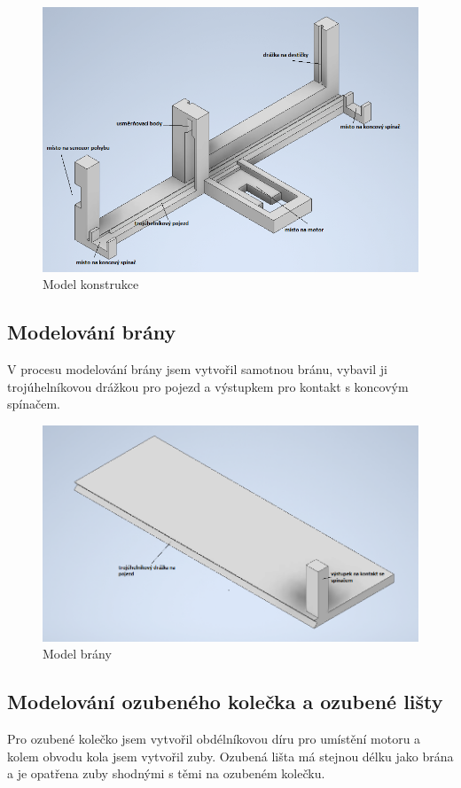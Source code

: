 \documentclass[12pt, a4paper, twoside]{report}
\begin{document}
	\begin{figure}[h]
		\centering
		\includegraphics[width=0.7\linewidth]{image/konstrukce.png}
		\caption{Model konstrukce}
		\label{fig:konstrukceobr}
	\end{figure}
	
	\subsection{Modelování brány}
	
	\noindent V procesu modelování brány jsem vytvořil samotnou bránu, vybavil ji trojúhelníkovou drážkou pro pojezd a výstupkem pro kontakt s koncovým spínačem. \\
	
	\begin{figure}[h]
		\centering
		\includegraphics[width=0.7\linewidth]{image/brana.png}
		\caption{Model brány}
		\label{fig:branaobr}
	\end{figure}
	
	\newpage	
	
	\subsection{Modelování ozubeného kolečka a ozubené lišty}
	
	\noindent Pro ozubené kolečko jsem vytvořil obdélníkovou díru pro umístění motoru a kolem obvodu kola jsem vytvořil zuby. Ozubená lišta má stejnou délku jako brána a je opatřena zuby shodnými s těmi na ozubeném kolečku. \\
	
\end{document}

